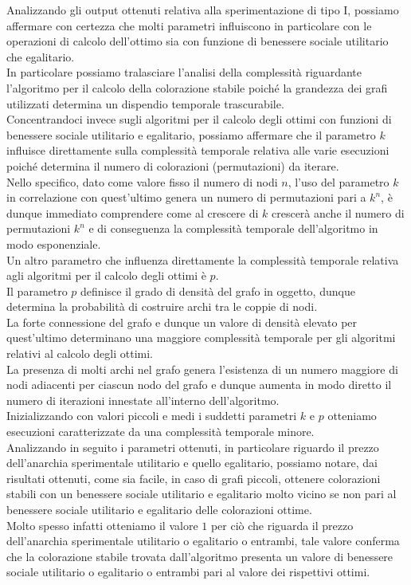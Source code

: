 Analizzando gli output ottenuti relativa alla sperimentazione di tipo I, possiamo affermare con certezza che molti parametri influiscono in particolare con le operazioni di calcolo dell'ottimo sia con funzione di benessere sociale utilitario che egalitario.\\
In particolare possiamo tralasciare l'analisi della complessità riguardante l'algoritmo per il calcolo della colorazione stabile poiché la grandezza dei grafi utilizzati determina un dispendio temporale trascurabile.\\

Concentrandoci invece sugli algoritmi per il calcolo degli ottimi con funzioni di benessere sociale utilitario e egalitario, possiamo affermare che il parametro $k$ influisce direttamente sulla complessità temporale relativa alle varie esecuzioni poiché determina il numero di colorazioni (permutazioni) da iterare.\\

Nello specifico, dato come valore fisso il numero di nodi $n$, l'uso del parametro $k$ in correlazione con quest'ultimo genera un numero di permutazioni pari a \(k^n\), è dunque immediato comprendere come al crescere di $k$ crescerà anche il numero di permutazioni \(k^n\) e di conseguenza la complessità temporale dell'algoritmo in modo esponenziale.\\

Un altro parametro che influenza direttamente la complessità temporale relativa agli algoritmi per il calcolo degli ottimi è $p$.\\
Il parametro $p$ definisce il grado di densità del grafo in oggetto, dunque determina la probabilità di costruire archi tra le coppie di nodi.\\
La forte connessione del grafo e dunque un valore di densità elevato per quest'ultimo determinano una maggiore complessità temporale per gli algoritmi relativi al calcolo degli ottimi.\\
La presenza di molti archi nel grafo genera l'esistenza di un numero maggiore di nodi adiacenti per ciascun nodo del grafo e dunque aumenta in modo diretto il numero di iterazioni innestate all'interno dell'algoritmo.\\

Inizializzando con valori piccoli e medi i suddetti parametri $k$ e $p$ otteniamo esecuzioni caratterizzate da una complessità temporale minore.\\

Analizzando in seguito i parametri ottenuti, in particolare riguardo il prezzo dell'anarchia sperimentale utilitario e quello egalitario, possiamo notare, dai risultati ottenuti, come sia facile, in caso di grafi piccoli, ottenere colorazioni stabili con un benessere sociale utilitario e egalitario molto vicino se non pari al benessere sociale utilitario e egalitario delle colorazioni ottime.\\

Molto spesso infatti otteniamo il valore $1$ per ciò che riguarda il prezzo dell'anarchia sperimentale utilitario o egalitario o entrambi, tale valore conferma che la colorazione stabile trovata dall'algoritmo presenta un valore di benessere sociale utilitario o egalitario o entrambi pari al valore dei rispettivi ottimi.\\